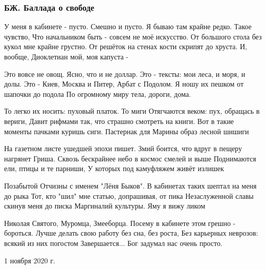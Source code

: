  
 
 

\subsubsection{БЖ. Баллада о свободе}


У меня в кабинете - пусто. Смешно и пусто.
Я бываю там крайне редко. Такое чувство,
Что начальником быть - совсем не моё искусство.
От большого стола без кукол мне крайне грустно.
От решёток на стенах кости скрипят до хруста.
И, вообще, Диоклетиан мой, моя капуста - 

Это вовсе не овощ. Ясно, что и не доллар.
Это - тексты: мои леса, и моря, и долы.
Это - Киев, Москва и Питер, Арбат с Подолом.
Я ношу их пешком от шапочки до подола
По огромному миру тела, дороги, дома.

То легко их носить: пуховый платок. То миги
Отягчаются веком: пух, обращась в вериги,
Давит рифмами так, что страшно смотреть на книги.
Вот в такие моменты пачками куришь сиги.
Пастернак для Марины образ лесной шишиги

На газетном листе ушедшей эпохи пишет.
Змий боится, что вдруг в пещеру нагрянет Гриша.
Сквозь бескрайнее небо в космос смелей и выше
Поднимаются ели, птицы и те парниши,
У которых под камуфляжем живёт излишек

Позабытой Отчизны с именем "Лёня Быков".
В кабинетах таких шептал на меня до рыка
Тот, кто "шил" мне статью, допрашивая, от пика
Незаслуженной славы скинув меня до писка
Маргиналий культуры. Яму я вижу ликом

Николая Святого, Муромца, Змееборца.
Посему в кабинете этом грешно - бороться.
Лучше делать свою работу без сна, без роста,
Без карьерных неврозов: всякий из них погостом
Завершается... Бог задумал нас очень просто.

1 ноября 2020 г.

